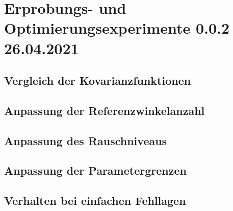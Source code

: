 %

\chapter{Erprobungs- und Optimierungsexperimente 0.0.2 26.04.2021}\label{ch:erprobungs-u-opt-exp}
	
	
\section{Vergleich der Kovarianzfunktionen}\label{sec:exp1}


\section{Anpassung der Referenzwinkelanzahl}\label{sec:exp2}


\section{Anpassung des Rauschniveaus}\label{sec:exp3}


\section{Anpassung der Parametergrenzen}\label{sec:exp4}


\section{Verhalten bei einfachen Fehllagen}\label{sec:exp5}
	
